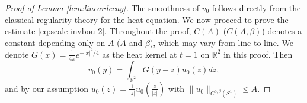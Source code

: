 \documentclass[12pt]{amsart}
\numberwithin{equation}{section}              %
\theoremstyle{remark}
\begin{document}
    \begin{proof}[Proof of Lemma \ref{lem:lineardecay}]
		The smoothness of $v_0$ follows directly from the classical regularity theory for the heat equation.
		We now proceed to prove the estimate \eqref{eq:scale-invbou-2}.
		Throughout the proof, $C(A)$ ($C(A,\beta)$) denotes a constant depending only on $A$ ($A$ and $\beta$), which may vary from line to line. 
        We denote $G(x) = \frac{1}{4\pi} e^{-|x|^2/4}$ as the heat kernel at $t=1$ on $\mathbb{R}^2$ in this proof.
        Then
		\begin{equation*}
			v_0(y) = \int_{\mathbb{R}^2} G(y-z)u_0( z)dz,
		\end{equation*}
        and by our assumption $u_0( z) = \frac{1}{|z|}u_0\left( \frac{z}{|z|}\right) $ with $\|u_0\|_{C^{0,\beta}(S^1)}\leq A$.
        

\end{proof}
\end{document}
